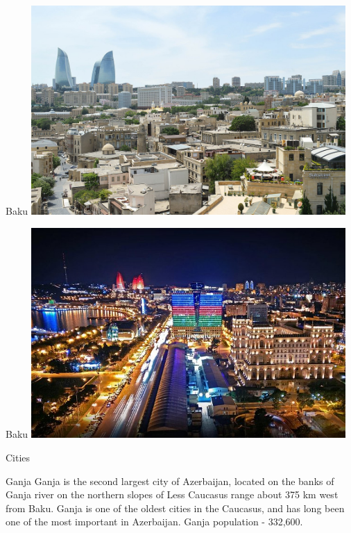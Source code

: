 \documentclass[hyperref={pdfpagemode=FullScreen}]{beamer}
\begin{document}
\begin{frame}{Baku}
\includegraphics[width=12cm, height=8cm]{img/baku02.jpeg}
\end{frame}

\begin{frame}{Baku}
\includegraphics[width=12cm, height=8cm]{img/baku03.jpg}
\end{frame}

\begin{frame}{Cities}
\begin{alertblock}{Ganja}
\justifying Ganja is the second largest city of Azerbaijan, located on the banks of Ganja river on the northern slopes of Less Caucasus range about 375 km west from Baku. Ganja is one of the oldest cities in the Caucasus, and has long been one of the most important in Azerbaijan. Ganja population - 332,600.
\end{alertblock}
\end{frame}
\end{document}
